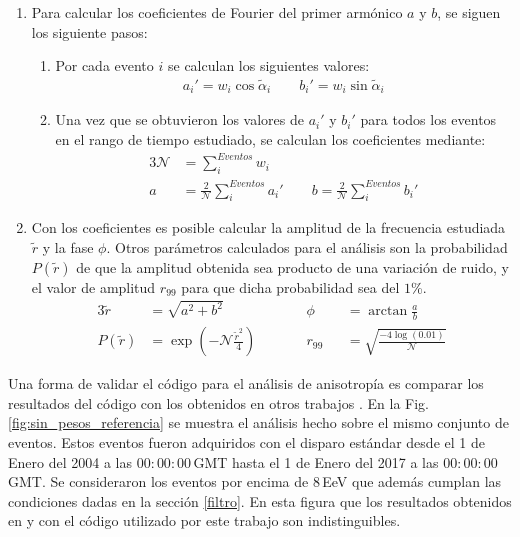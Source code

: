\begin{enumerate}
        \item Para calcular los coeficientes de Fourier del primer armónico $a$ y $b$, se siguen los siguiente pasos:
        \begin{enumerate}
          \item Por cada evento  $i$ se calculan los siguientes valores:
          \begin{align}
             a_i' = {w_i}\cos\tilde{\alpha}_i \qquad
             b_i' = {w_i}\sin\tilde{\alpha}_i
         \end{align}
         \item Una vez que se obtuvieron los valores de $a_i'$ y $b_i'$ para todos los eventos en el rango de tiempo estudiado, se calculan los coeficientes mediante:
         \begin{alignat}{3}
          \mathcal{N} &= \sum^{Eventos}_i w_i \\
            a &= \frac{2}{\mathcal{N}} \sum^{Eventos}_i a_i' \qquad
            b = \frac{2}{\mathcal{N}} \sum^{Eventos}_i b_i'  
         \end{alignat}
        \end{enumerate}
        \item Con los coeficientes es posible calcular la amplitud de la frecuencia estudiada $\tilde{r}$ y la fase $\phi$. Otros parámetros calculados para el análisis son la probabilidad $P(\tilde{r})$ de que la amplitud obtenida sea producto de una variación de ruido, y el valor de amplitud $r_{99}$ para que dicha probabilidad sea del $1$\%. 
        \begin{alignat}{3}
            \tilde{r} &= \sqrt{a^2 +b^2}             
               \qquad &&   \phi&&= \arctan\frac{a}{b}\\
          P(\tilde{r})&= \exp(-\mathcal{N}\frac{\tilde{r}^2}{4}) 
             \qquad &&   r_{99}&&= \sqrt{\frac{-4\log(0.01)}{\mathcal{N}}}
        \end{alignat}

      \end{enumerate}

    Una forma de validar el código para el análisis de anisotropía es comparar los resultados del código con los obtenidos en otros trabajos \cite{taborda}. En la Fig.\ref{fig:sin_pesos_referencia} se muestra el análisis hecho sobre el mismo conjunto de eventos. Estos eventos fueron adquiridos con el disparo estándar desde el 1 de Enero del 2004 a las $00:00:00\,$GMT  hasta el 1 de Enero del 2017 a las $00:00:00\,$GMT. Se consideraron los eventos por encima de $8\,$EeV que además cumplan las condiciones dadas en la sección \ref{filtro}.  En esta figura que los resultados obtenidos en \cite{taborda} y con el código utilizado por este trabajo son indistinguibles. 

